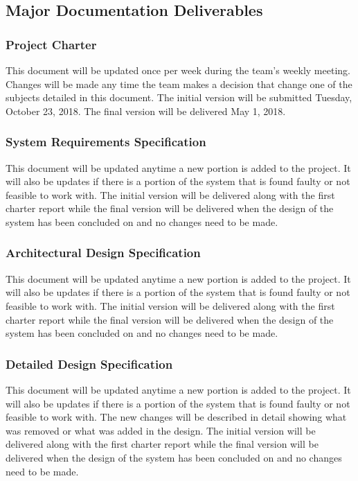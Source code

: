 
\subsection{Major Documentation Deliverables}

\subsubsection{Project Charter}
This document will be updated once per week during the team's weekly meeting. Changes will be made any time the team makes a decision that change one of the subjects detailed in this document. The initial version will be submitted Tuesday, October 23, 2018. The final version will be delivered May 1, 2018.

\subsubsection{System Requirements Specification}
This document will be updated anytime a new portion is added to the project. It will also be updates if there is a portion of the system that is found faulty or not feasible to work with. The initial version will be delivered along with the first charter report while the final version will be delivered when the design of the system has been concluded on and no changes need to be made.

\subsubsection{Architectural Design Specification}
This document will be updated anytime a new portion is added to the project. It will also be updates if there is a portion of the system that is found faulty or not feasible to work with. The initial version will be delivered along with the first charter report while the final version will be delivered when the design of the system has been concluded on and no changes need to be made.

\subsubsection{Detailed Design Specification}
This document will be updated anytime a new portion is added to the project. It will also be updates if there is a portion of the system that is found faulty or not feasible to work with. The new changes will be described in detail showing what was removed or what was added in the design. The initial version will be delivered along with the first charter report while the final version will be delivered when the design of the system has been concluded on and no changes need to be made.

